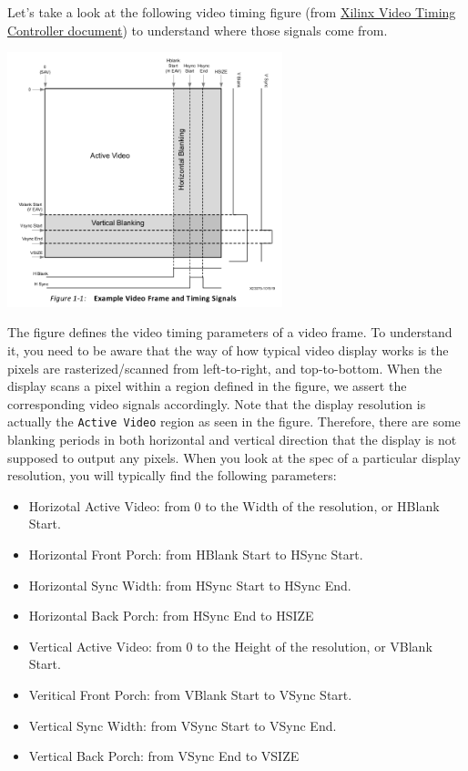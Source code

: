 \documentclass[11pt]{article}
\begin{document}
Let's take a look at the following video timing figure (from \href{https://www.xilinx.com/support/documentation/ip_documentation/v_tc/v6_2/pg016_v_tc.pdf}{Xilinx Video Timing Controller document}) to understand where those signals come from.

\begin{center}
\includegraphics[width=0.6\textwidth]{figs/video_timings.png}
\end{center}

The figure defines the video timing parameters of a video frame. To understand it, you need to be aware that the way of how typical video display works is the pixels are rasterized/scanned from left-to-right, and top-to-bottom. When the display scans a pixel within a region defined in the figure, we assert the corresponding video signals accordingly. Note that the display resolution is actually the \verb|Active Video| region as seen in the figure. Therefore, there are some blanking periods in both horizontal and vertical direction that the display is not supposed to output any pixels. When you look at the spec of a particular display resolution, you will typically find the following parameters:

\begin{itemize}
  \item Horizotal Active Video: from 0 to the Width of the resolution, or HBlank Start.
  \item Horizontal Front Porch: from HBlank Start to HSync Start.
  \item Horizontal Sync Width: from HSync Start to HSync End.
  \item Horizontal Back Porch: from HSync End to HSIZE
  \item Vertical Active Video: from 0 to the Height of the resolution, or VBlank Start.
  \item Veritical Front Porch: from VBlank Start to VSync Start.
  \item Vertical Sync Width: from VSync Start to VSync End.
  \item Vertical Back Porch: from VSync End to VSIZE
\end{itemize}
\end{document}
